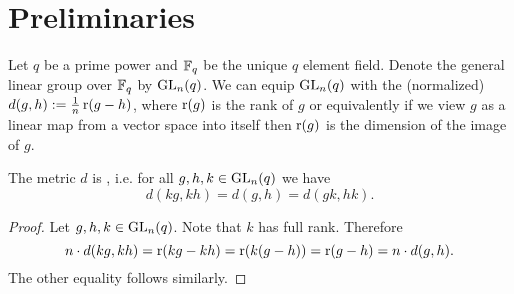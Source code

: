 








\section{Preliminaries}\label{sec:generalDefns}
Let $q$ be a prime power and $\mathbb{F}_q$ be the unique $q$ element field. Denote the general linear group over $\mathbb{F}_q$ by $\operatorname{GL}_n(q)$. We can equip $\operatorname{GL}_n(q)$ with the (normalized)  $d(g,h):=\frac{1}{n}\operatorname{r}(g-h)$, where $\operatorname{r}(g)$ is the rank of $g$ or equivalently if we view $g$ as a linear map from a vector space into itself then $\operatorname{r}(g)$ is the dimension of the image of $g$. 

\begin{lemma}
	The metric $d$ is , i.e. for all $g,h,k\in \operatorname{GL}_n(q)$ we have 
	\[d(kg,kh)=d(g,h)=d(gk,hk).\] 
\end{lemma}
\begin{proof}
	Let $g,h,k\in \operatorname{GL}_n(q)$. Note that $k$ has full rank. Therefore
	\[n\cdot d(kg,kh)=\operatorname{r}(kg-kh)=\operatorname{r}(k(g-h))=\operatorname{r}(g-h)=n\cdot d(g,h).\]
	The other equality follows similarly.
\end{proof}


